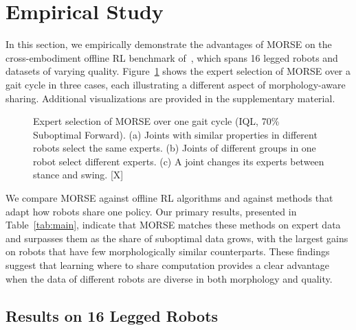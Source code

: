 \section{Empirical Study}
\label{sec:experiments}

In this section, we empirically demonstrate the advantages of MORSE on the cross-embodiment offline RL benchmark
of~\citet{abe2026crossembodimentoffline}, which spans 16 legged robots and datasets of varying quality.
Figure~\ref{fig:selection} shows the expert selection of MORSE over a gait cycle in three cases, each illustrating a
different aspect of morphology-aware sharing. Additional visualizations are provided in the supplementary material.

\begin{figure}[t]
\centering
\fbox{\rule{0pt}{1.4in}\rule{0.95\linewidth}{0pt}}
\caption{Expert selection of MORSE over one gait cycle (IQL, 70\% Suboptimal Forward). (a) Joints with similar
properties in different robots select the same experts. (b) Joints of different groups in one robot select different
experts. (c) A joint changes its experts between stance and swing. [X]}
\label{fig:selection}
\end{figure}

We compare MORSE against offline RL algorithms and against methods that adapt how robots share one policy. Our
primary results, presented in Table~\ref{tab:main}, indicate that MORSE matches these methods on expert data and
surpasses them as the share of suboptimal data grows, with the largest gains on robots that have few morphologically
similar counterparts. These findings suggest that learning where to share computation provides a clear advantage when
the data of different robots are diverse in both morphology and quality.

\subsection{Results on 16 Legged Robots}
\label{sec:results}

